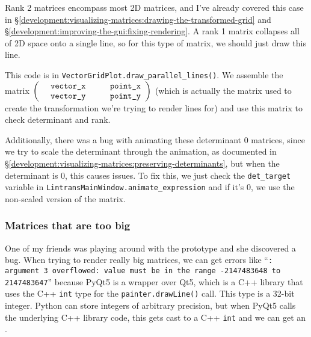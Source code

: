 \documentclass[../main.tex]{subfiles}
\begin{document}
Rank 2 matrices encompass most 2D matrices, and I've already covered this case in \S\ref{development:visualizing-matrices:drawing-the-transformed-grid} and \S\ref{development:improving-the-gui:fixing-rendering}. A rank 1 matrix collapses all of 2D space onto a single line, so for this type of matrix, we should just draw this line.

This code is in \texttt{VectorGridPlot.draw\_parallel\_lines()}. We assemble the matrix $\begin{pmatrix}\text{\texttt{vector\_x}} & \text{\texttt{point\_x}}\\ \text{\texttt{vector\_y}} & \text{\texttt{point\_y}}\end{pmatrix}$ (which is actually the matrix used to create the transformation we're trying to render lines for) and use this matrix to check determinant and rank.


Additionally, there was a bug with animating these determinant 0 matrices, since we try to scale the determinant through the animation, as documented in \S\ref{development:visualizing-matrices:preserving-determinants}, but when the determinant is 0, this causes issues. To fix this, we just check the \texttt{det\_target} variable in \texttt{LintransMainWindow.animate\_expression} and if it's 0, we use the non-scaled version of the matrix.


\subsubsection{Matrices that are too big\label{development:improving-the-gui:matrices-that-are-too-big}}

One of my friends was playing around with the prototype and she discovered a bug. When trying to render really big matrices, we can get errors like \enquote{\texttt{: argument 3 overflowed: value must be in the range -2147483648 to 2147483647}} because PyQt5 is a wrapper over Qt5, which is a C++ library that uses the C++ \texttt{int} type for the \texttt{painter.drawLine()} call. This type is a 32-bit integer. Python can store integers of arbitrary precision, but when PyQt5 calls the underlying C++ library code, this gets cast to a C++ \texttt{int} and we can get an .
\end{document}
